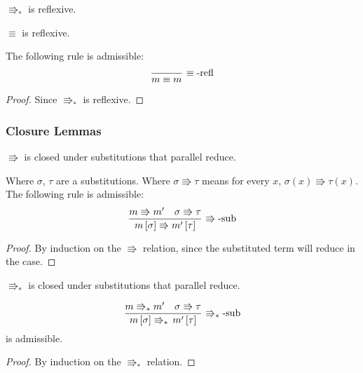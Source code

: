 \begin{fact} $\Rrightarrow_{\ast}$ is reflexive.
\end{fact} 
 
\begin{lem}$\equiv$ is reflexive.

The following rule is admissible:
\[
\frac{\,}{m\equiv m}\,\operatorname{\equiv-refl}
\]
\end{lem}
\begin{proof}
Since $\Rrightarrow_{\ast}$ is reflexive.
\end{proof}
 
\subsubsection{Closure Lemmas}
 
 
 
\begin{lem} $\Rrightarrow$ is closed under substitutions that parallel reduce.
 
Where $\sigma$, $\tau$ are a substitutions.
Where $\sigma\Rrightarrow\tau$ means for every $x$, $\sigma\left(x\right)\Rrightarrow\tau\left(x\right)$.
The following rule is admissible:
\[
\frac{m\Rrightarrow m'\quad\sigma\Rrightarrow\tau}{m\left[\sigma\right]\Rrightarrow m'\left[\tau\right]}\,\operatorname{\Rrightarrow-sub}
\]
\end{lem}
\begin{proof}
By induction on the $\Rrightarrow$ relation, since the substituted term will reduce in the  case.
\end{proof}
 
\begin{lem} $\Rrightarrow_{\ast}$ is closed under substitutions that parallel reduce.
\label{lem:sub-par-red}

\[
\frac{m\Rrightarrow_{\ast}m'\quad\sigma\Rrightarrow\tau}{m\left[\sigma\right]\Rrightarrow_{\ast}\,m'\left[\tau\right]}\,\operatorname{\Rrightarrow_{\ast}-sub}
\]
is admissible.
\end{lem}
\begin{proof}
By induction on the $\Rrightarrow_{\ast}$ relation.
\end{proof}

